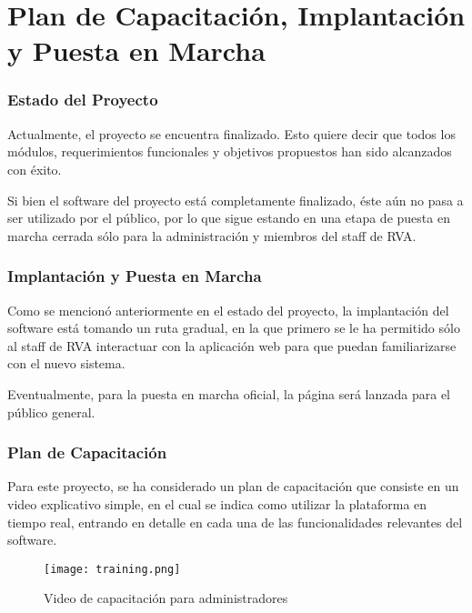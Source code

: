 \chapter{Plan de Capacitación, Implantación y Puesta en Marcha}

\subsection{Estado del Proyecto}
Actualmente, el proyecto se encuentra finalizado. Esto quiere decir que todos los módulos, requerimientos funcionales y objetivos propuestos han sido alcanzados con éxito.

Si bien el software del proyecto está completamente finalizado, éste aún no pasa a ser utilizado por el público, por lo que sigue estando en una etapa de puesta en marcha cerrada sólo para la administración y miembros del staff de RVA.

\subsection{Implantación y Puesta en Marcha}
Como se mencionó anteriormente en el estado del proyecto, la implantación del software está tomando un ruta gradual, en la que primero se le ha permitido sólo al staff de RVA interactuar con la aplicación web para que puedan familiarizarse con el nuevo sistema.

Eventualmente, para la puesta en marcha oficial, la página será lanzada para el público general.

\subsection{Plan de Capacitación}
Para este proyecto, se ha considerado un plan de capacitación que consiste en un video explicativo simple, en el cual se indica como utilizar la plataforma en tiempo real, entrando en detalle en cada una de las funcionalidades relevantes del software.

\begin{figure}[H]
  \begin{center}
    \texttt{[image: training.png]}
  \end{center}
  \caption[Video de capacitación para administradores]{Video de capacitación para administradores}
  \label{fig:training}
\end{figure}
